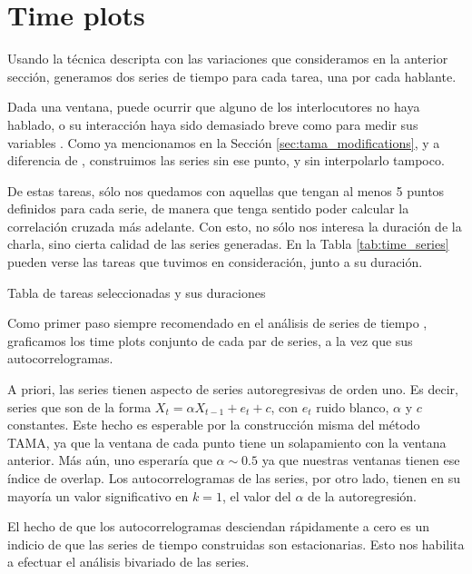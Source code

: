 \section{Time plots}
\label{sec:time_plots}
Usando la técnica descripta con las variaciones que consideramos en la anterior sección, generamos dos series de tiempo para cada tarea, una por cada hablante. 

Dada una ventana, puede ocurrir que alguno de los interlocutores no haya hablado, o su interacción haya sido demasiado breve como para medir sus variables \ap. Como ya mencionamos en la Sección \ref{sec:tama_modifications}, y a diferencia de \cite{KOU2008.2}, construimos las series sin ese punto, y sin interpolarlo tampoco.

De estas tareas, sólo nos quedamos con aquellas que tengan al menos 5 puntos definidos para cada serie, de manera que tenga sentido poder calcular la correlación cruzada más adelante. Con esto, no sólo nos interesa la duración de la charla, sino cierta calidad de las series generadas. En la Tabla \ref{tab:time_series} pueden verse las tareas que tuvimos en consideración, junto a su duración.

\begin{table}[t]
\centering

\caption{Tabla de tareas seleccionadas y sus duraciones}
\label{tab:time_series}
\end{table}


Como primer paso siempre recomendado en el análisis de series de tiempo \cite{CHATFIELD}, graficamos los time plots conjunto de cada par de series, a la vez que sus autocorrelogramas. 

A priori, las series tienen aspecto de series autoregresivas de orden uno. Es decir, series que son de la forma $X_t = \alpha X_{t-1} + e_t + c$, con $e_t$ ruido blanco, $\alpha$ y $c$ constantes. Este hecho es esperable  por la construcción misma del método TAMA, ya que la ventana de cada punto tiene un solapamiento con la ventana anterior. Más aún, uno esperaría que $\alpha \sim 0.5$ ya que nuestras ventanas tienen ese índice de overlap. Los autocorrelogramas de las series, por otro lado, tienen en su mayoría un valor significativo en $k = 1$, el valor del $\alpha$ de la autoregresión.

El hecho de que los autocorrelogramas desciendan rápidamente a cero es un indicio de que las series de tiempo construidas son estacionarias. Esto nos habilita a efectuar el análisis bivariado de las series.
